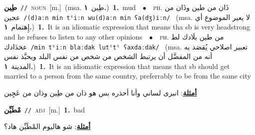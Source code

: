 \documentclass[10pt,a4paper,twoside]{article} %
\begin{document}
\begin{multicols}{2}
{\setlength\topsep{0pt}\textbf{\foreignlanguage{arabic}{طِين}}\ {\color{gray}\texttt{//}\color{black}}\ \textsc{noun}\ [m.]\ \color{gray}(msa. \foreignlanguage{arabic}{طِين}~\foreignlanguage{arabic}{\textbf{١.}})\color{black}\ \textbf{1.}~mud\ \ $\bullet$\ \ \textsc{ph.} \color{gray} \foreignlanguage{arabic}{ذَان من طين وذَان من عجين}\color{black}\ {\color{gray}\texttt{/{\sffamily (d)aːn min tˤiːn wu(d)aːn min ʕa(dʒ)iːn}/}\color{black}}\ \color{gray} (msa. \foreignlanguage{arabic}{لا يعير الموضوع أي إِهتمام}~\foreignlanguage{arabic}{\textbf{١.}})\color{black}\ \textbf{1.}~It is an idiomatic expression that means tha sb is very headstrong and he refuses to listen to any other opinions\ \ $\bullet$\ \ \textsc{ph.} \color{gray} \foreignlanguage{arabic}{من طين بلَادك لط عخدَادك}\color{black}\ {\color{gray}\texttt{/{\sffamily min tˤiːn blaːdak lutˤtˤ ʕaxdaːdak}/}\color{black}}\ \color{gray} (msa. \foreignlanguage{arabic}{تعبير اصلاحي يُقصَد به أنه من المفضَّل أن يرتبط الشخص من شخص من نفس البلد ويحبَّذ نفس المدينة}~\foreignlanguage{arabic}{\textbf{١.}})\color{black}\ \textbf{1.}~It is an idiomatic expression that means  that sb should get married to a person from the same country, preferrably to be from the same city\  \begin{flushright}\color{gray}\foreignlanguage{arabic}{\textbf{\underline{\foreignlanguage{arabic}{أمثلة}}}: انبرى لساني وأنا أحذره بس هو ذان من طِين وذان من عَجِِين}\end{flushright}\color{black}} \vspace{2mm}

{\setlength\topsep{0pt}\textbf{\foreignlanguage{arabic}{مْطَيِّن}}\ {\color{gray}\texttt{//}\color{black}}\ \textsc{adj}\ [m.]\ \textbf{1.}~bad\  \begin{flushright}\color{gray}\foreignlanguage{arabic}{\textbf{\underline{\foreignlanguage{arabic}{أمثلة}}}: شو هاليوم المْطَيِّن هاد؟}\end{flushright}\color{black}} \vspace{2mm}

\end{multicols}
\end{document}
